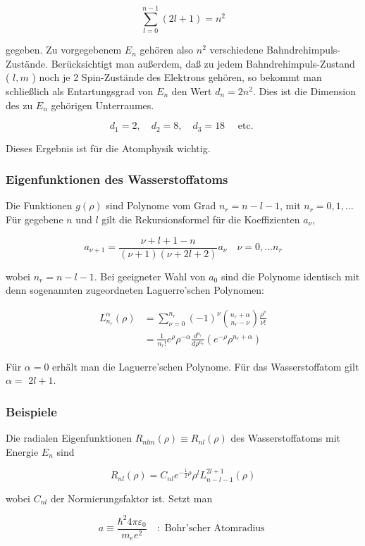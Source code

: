 \documentclass[10pt, letterpaper]{article}
\begin{document}
$$
\sum_{l=0}^{n-1}(2 l+1)=n^{2}
$$

gegeben. Zu vorgegebenem $E_{n}$ gehören also $n^{2}$ verschiedene Bahndrehimpuls-Zustände. Berücksichtigt man außerdem, daß zu jedem Bahndrehimpuls-Zustand ( $l, m$ ) noch je 2 Spin-Zustände des Elektrons gehören, so bekommt man schließlich als Entartungsgrad von $E_{n}$ den Wert $d_{n}=2 n^{2}$. Dies ist die Dimension des zu $E_{n}$ gehörigen Unterraumes.

$$
d_{1}=2, \quad d_{2}=8, \quad d_{3}=18 \quad \text { etc. }
$$

Dieses Ergebnis ist für die Atomphysik wichtig.

\subsubsection*{Eigenfunktionen des Wasserstoffatoms}
Die Funktionen $g(\rho)$ sind Polynome vom Grad $n_{r}=n-l-1$, mit $n_{r}=0,1, \ldots$ Für gegebene $n$ und $l$ gilt die Rekursionsformel für die Koeffizienten $a_{\nu}$,

$$
a_{\nu+1}=\frac{\nu+l+1-n}{(\nu+1)(\nu+2 l+2)} a_{\nu} \quad \nu=0, \ldots n_{r}
$$

wobei $n_{r}=n-l-1$. Bei geeigneter Wahl von $a_{0}$ sind die Polynome identisch mit denn sogenannten zugeordneten Laguerre'schen Polynomen:

$$
\begin{aligned}
L_{n_{r}}^{\alpha}(\rho) & =\sum_{\nu=0}^{n_{r}}(-1)^{\nu}\binom{n_{r}+\alpha}{n_{r}-\nu} \frac{\rho^{\nu}}{\nu!} \\
& =\frac{1}{n_{r}!} e^{\rho} \rho^{-\alpha} \frac{d^{n_{r}}}{d \rho^{n_{r}}}\left(e^{-\rho} \rho^{n_{r}+\alpha}\right)
\end{aligned}
$$

Für $\alpha=0$ erhält man die Laguerre'schen Polynome. Für das Wasserstoffatom gilt $\alpha=$ $2 l+1$.

\subsubsection*{Beispiele}
Die radialen Eigenfunktionen $R_{n l m}(\rho) \equiv R_{n l}(\rho)$ des Wasserstoffatoms mit Energie $E_{n}$ sind

$$
R_{n l}(\rho)=C_{n l} e^{-\frac{1}{2} \rho} \rho^{l} L_{n-l-1}^{2 l+1}(\rho)
$$

wobei $C_{n l}$ der Normierungsfaktor ist. Setzt man

$$
a \equiv \frac{\hbar^{2} 4 \pi \varepsilon_{0}}{m_{e} e^{2}} \quad: \text { Bohr'scher Atomradius }
$$
\end{document}
